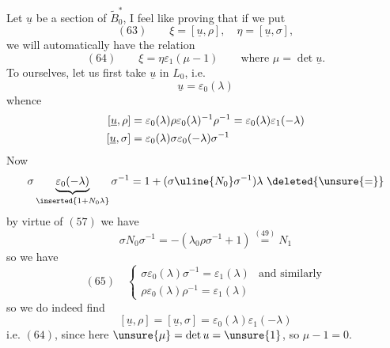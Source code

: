 Let $\underline u$ be a section of $\widetilde B_0^*$, I feel like proving that if we put
\[
(63)\qquad \xi=[\underline u,\rho],\quad\eta=[\underline u,\sigma],
\]
we will automatically have the relation
\[
(64)\qquad\xi=\eta\varepsilon_1(\mu-1)\qquad\text{where }\mu=\det\underline u.
\]
To  ourselves, let us first take $\underline u$ in $L_0$, i.e.
\[
\underline u=\varepsilon_0(\lambda)
\]
whence
\[
\begin{aligned}
\relax
[\underline u,\rho]&=\varepsilon_0(\lambda)\rho\varepsilon_0(\lambda)^{-1}\rho^{-1}
=\varepsilon_0(\lambda)\varepsilon_1(-\lambda)\\
[\underline u,\sigma]&=\varepsilon_0(\lambda)\sigma\varepsilon_0(-\lambda)\sigma^{-1}
\end{aligned}
\]
Now
\[
\sigma\underbrace{\varepsilon_0(-\lambda)}_{\inserted{1+N_0\lambda}}\sigma^{-1}
=1+(\sigma\uline{N_0}\sigma^{-1})\lambda\ \deleted{\unsure{=}}
\]
  by virtue of $(57)$ we have
\[
\sigma N_0\sigma^{-1}=-(\lambda_0\rho\sigma^{-1}+1)\overset{(49)}{=}N_1
\]
so we have
\[
(65)\quad\left\{\begin{array}{ll}
\sigma\varepsilon_0(\lambda)\sigma^{-1}=\varepsilon_1(\lambda)&\text{and similarly}\\
\rho\varepsilon_0(\lambda)\rho^{-1}=\varepsilon_1(\lambda)
\end{array}\right.
\]
so we do indeed find
\[
[\underline u,\rho]=[\underline u,\sigma]=\varepsilon_0(\lambda)\varepsilon_1(-\lambda)
\]
i.e. $(64)$, since here $\unsure{\mu}=\det u=\unsure{1}$, so $\mu-1=0$.



